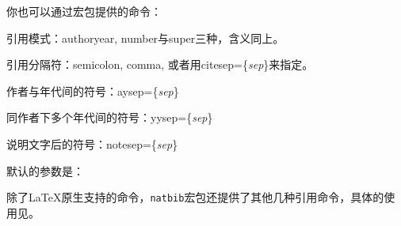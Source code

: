 你也可以通过宏包提供的\latexline{\\setcitestyle}命令：
\begin{feae}
\item 引用模式：authoryear, number与super三种，含义同上。
\item 引用分隔符：semicolon, comma, 或者用citesep=\{\textit{sep}\}来指定。
\item 作者与年代间的符号：aysep=\{\textit{sep}\}
\item 同作者下多个年代间的符号：yysep=\{\textit{sep}\}
\item 说明文字后的符号：notesep=\{\textit{sep}\}
\end{feae}

默认的参数是：
\begin{latex}{}
\end{latex}

除了\LaTeX 原生支持的\latexline{\\cite}命令，\texttt{natbib}宏包还提供了其他几种引用命令，具体的使用见。

